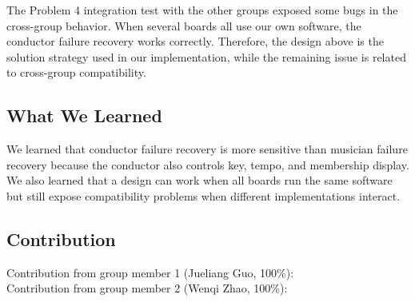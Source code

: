 \documentclass[11pt,a4paper]{article}
\begin{document}
The Problem 4 integration test with the other groups exposed some bugs in the cross-group behavior. When several boards all use our own software, the conductor failure recovery works correctly. Therefore, the design above is the solution strategy used in our implementation, while the remaining issue is related to cross-group compatibility.

\subsection*{What We Learned}

We learned that conductor failure recovery is more sensitive than musician failure recovery because the conductor also controls key, tempo, and membership display. We also learned that a design can work when all boards run the same software but still expose compatibility problems when different implementations interact.

\subsection*{Contribution}

Contribution from group member 1 (Jueliang Guo, 100\%):\\
Contribution from group member 2 (Wenqi Zhao, 100\%):
\end{document}
